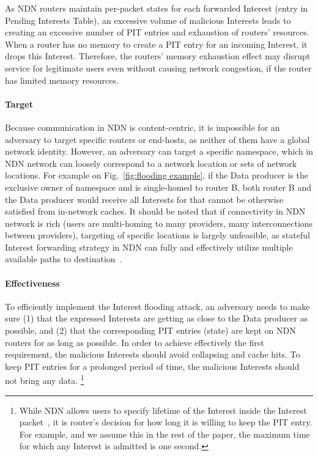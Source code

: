 As NDN routers maintain per-packet states for each forwarded Interest (entry in Pending Interests Table), an excessive volume of malicious Interests leads to creating an excessive number of PIT entries and exhaustion of routers' resources.
When a router has no memory to create a PIT entry for an incoming Interest, it drops this Interest.
Therefore, the routers' memory exhaustion effect may disrupt service for legitimate users even without causing network congestion, if the router has limited memory resources.

\paragraph{Target}

Because communication in NDN is content-centric, it is impossible for an adversary to target specific routers or end-hosts, as neither of them have a global network identity. %
However, an adversary can target a specific namespace, which in NDN network can loosely correspond to a network location or sets of network locations.
For example on Fig.~\ref{fig:flooding example}, if the Data producer is the exclusive owner of  namespace and is single-homed to router B, both router B and the Data producer would receive all Interests for  that cannot be otherwise satisfied from in-network caches.
It should be noted that if connectivity in NDN network is rich (users are multi-homing to many providers, many interconnections between providers), targeting of specific locations is largely unfeasible, as stateful Interest forwarding strategy in NDN can fully and effectively utilize multiple available paths to destination~\cite{adaptive-forwarding}.


\paragraph{Effectiveness}

To efficiently implement the Interest flooding attack, an adversary needs to make sure (1) that the expressed Interests are getting as close to the Data producer as possible, and (2) that the corresponding PIT entries (state) are kept on NDN routers for as long as possible.
In order to achieve effectively the first requirement, the malicious Interests should avoid collapsing and cache hits.
To keep PIT entries for a prolonged period of time, the malicious Interests should not bring any data.%
\footnote{While NDN allows users to specify lifetime of the Interest inside the Interest packet~\cite{ndn-conext,ndn-tr}, it is router's decision for how long it is willing to keep the PIT entry.  For example, and we assume this in the rest of the paper, the maximum time for which any Interest is admitted is one second.} 

